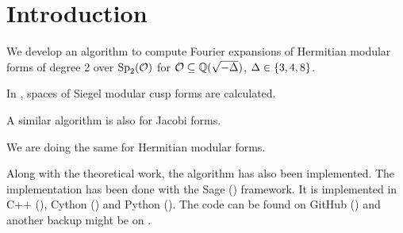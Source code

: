 
\section{Introduction}

We develop an algorithm to compute Fourier expansions of Hermitian modular forms of degree 2 over $\operatorname{Sp}_2(\mathcal{O})$ for $\mathcal{O} \subseteq \mathbb{Q}(\sqrt{-\Delta})$, $\Delta \in \Set{3,4,8}$.

In \cite{PoorYuen07Comp}, spaces of Siegel modular cusp forms are calculated.

A similar algorithm is also \cite[Algorithm 4.3]{Raum12Jacobi} for Jacobi forms.

We are doing the same for Hermitian modular forms.

Along with the theoretical work, the algorithm has also been implemented. The implementation has been done with the Sage (\cite{sage}) framework. It is implemented in C++ (\cite{cpp}), Cython (\cite{cython}) and Python (\cite{python}). The code can be found on GitHub (\cite{Zeyer13Github}) and another backup might be on \cite{Zeyer13Homepage}.
